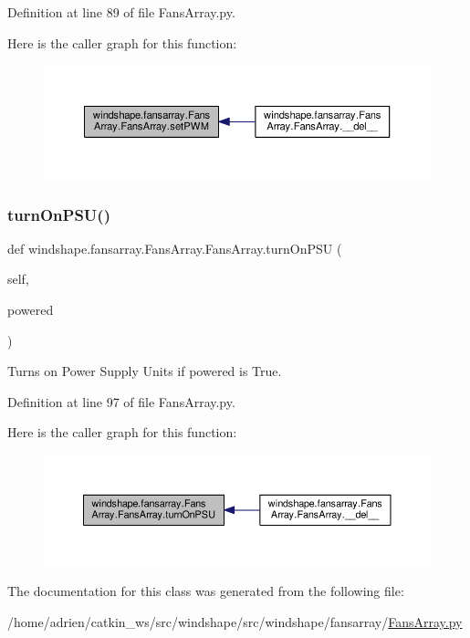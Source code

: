 Definition at line 89 of file Fans\+Array.\+py.

Here is the caller graph for this function\+:\nopagebreak
\begin{figure}[H]
\begin{center}
\leavevmode
\includegraphics[width=350pt]{classwindshape_1_1fansarray_1_1_fans_array_1_1_fans_array_a420bbec4827c3a8fb3bff65aaba918d7_icgraph}
\end{center}
\end{figure}
\mbox{\label{classwindshape_1_1fansarray_1_1_fans_array_1_1_fans_array_adafadce72737f9e1228fa6ff0cd93779}} 
\subsubsection{\texorpdfstring{turn\+On\+P\+S\+U()}{turnOnPSU()}}
{\footnotesize\ttfamily def windshape.\+fansarray.\+Fans\+Array.\+Fans\+Array.\+turn\+On\+P\+SU (\begin{DoxyParamCaption}\item[{}]{self,  }\item[{}]{powered }\end{DoxyParamCaption})}

\begin{DoxyVerb}Turns on Power Supply Units if powered is True.\end{DoxyVerb}
 

Definition at line 97 of file Fans\+Array.\+py.

Here is the caller graph for this function\+:\nopagebreak
\begin{figure}[H]
\begin{center}
\leavevmode
\includegraphics[width=350pt]{classwindshape_1_1fansarray_1_1_fans_array_1_1_fans_array_adafadce72737f9e1228fa6ff0cd93779_icgraph}
\end{center}
\end{figure}


The documentation for this class was generated from the following file\+:\begin{DoxyCompactItemize}
\item 
/home/adrien/catkin\+\_\+ws/src/windshape/src/windshape/fansarray/\mbox{\hyperlink{_fans_array_8py}{Fans\+Array.\+py}}\end{DoxyCompactItemize}

